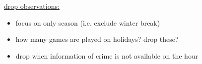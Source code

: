 \documentclass[11pt, a4paper]{article} %
\begin{document}
\underline{drop observations:}
\begin{itemize}
	\item focus on only season (i.e. exclude winter break)
	\item how many games are played on holidays? drop these? 
	\item drop when information of crime is not available on the hour
\end{itemize}
\end{document}

